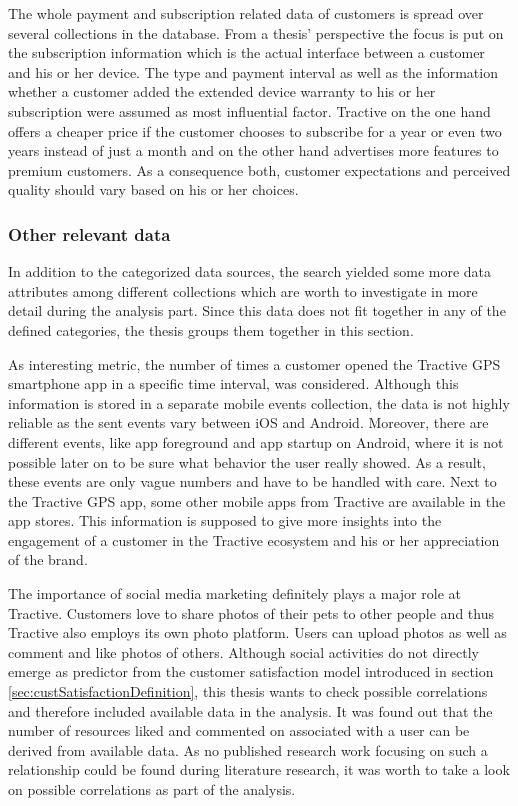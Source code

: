 The whole payment and subscription related data of customers is spread over several collections in the database. From a thesis' perspective the focus is put on the subscription information which is the actual interface between a customer and his or her device. The type and payment interval as well as the information whether a customer added the extended device warranty to his or her subscription were assumed as most influential factor. Tractive on the one hand offers a cheaper price if the customer chooses to subscribe for a year or even two years instead of just a month and on the other hand advertises more features to premium customers. As a consequence both, customer expectations and perceived quality should vary based on his or her choices.

\subsubsection{Other relevant data}
In addition to the categorized data sources, the search yielded some more data attributes among different collections which are worth to investigate in more detail during the analysis part. Since this data does not fit together in any of the defined categories, the thesis groups them together in this section. 

As interesting metric, the number of times a customer opened the Tractive GPS smartphone app in a specific time interval, was considered. Although this information is stored in a separate mobile events collection, the data is not highly reliable as the sent events vary between iOS and Android. Moreover, there are different events, like app foreground and app startup on Android, where it is not possible later on to be sure what behavior the user really showed. As a result, these events are only vague numbers and have to be handled with care. Next to the Tractive GPS app, some other mobile apps from Tractive are available in the app stores. This information is supposed to give more insights into the engagement of a customer in the Tractive ecosystem and his or her appreciation of the brand. 

The importance of social media marketing definitely plays a major role at Tractive. Customers love to share photos of their pets to other people and thus Tractive also employs its own photo platform. Users can upload photos as well as comment and like photos of others. Although social activities do not directly emerge as predictor from the customer satisfaction model introduced in section \ref{sec:custSatisfactionDefinition}, this thesis wants to check possible correlations and therefore included available data in the analysis. It was found out that the number of resources liked and commented on associated with a user can be derived from available data. As no published research work focusing on such a relationship could be found during literature research, it was worth to take a look on possible correlations as part of the analysis. 

